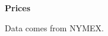 \documentclass{beamer}
\begin{document}
\begin{frame}
{\bf Prices}



\begin{center}
Data comes from NYMEX.
\end{center}
\end{frame}
\end{document}
